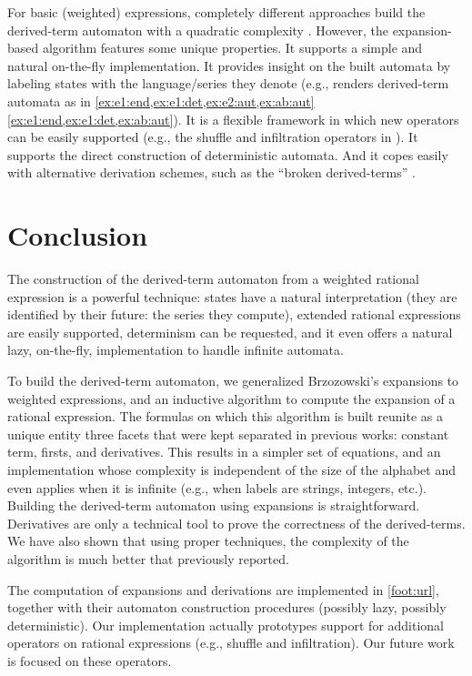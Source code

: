 \documentclass[a4paper,USenglish]{lipics}
\begin{document}
For basic (weighted) expressions, completely different approaches build the
derived-term automaton with a quadratic complexity
\citep{allauzen.2006.mfcs.2, champarnaud.2007.dlt.2}.  However, the
expansion-based algorithm features some unique properties.  It supports a
simple and natural on-the-fly implementation.  It provides insight on the
built automata by labeling states with the language/series they denote
(e.g., \vcsn renders derived-term automata as in 
{\cref{ex:e1:end,ex:e1:det,ex:e2:aut,ex:ab:aut}}
{\cref{ex:e1:end,ex:e1:det,ex:ab:aut}}).  It is a flexible framework in
which new operators can be easily supported (e.g., the shuffle and
infiltration operators in \vcsn).  It supports the direct construction of
deterministic automata.  And it copes easily with alternative derivation
schemes, such as the ``broken derived-terms'' \citep{lombardy.04.latin,
  lombardy.2005.tcs, lombardy.2010.rairo, angrand.2010.jalc}.

\section{Conclusion}
\label{sec:conc}
The construction of the derived-term automaton from a weighted rational
expression is a powerful technique: states have a natural interpretation
(they are identified by their future: the series they compute), extended
rational expressions are easily supported, determinism can be requested, and
it even offers a natural lazy, on-the-fly, implementation to handle infinite
automata.

To build the derived-term automaton, we generalized Brzozowski's expansions
to weighted expressions, and an inductive algorithm to compute the expansion
of a rational expression.  The formulas on which this algorithm is built
reunite as a unique entity three facets that were kept separated in previous
works: constant term, firsts, and derivatives.  This results in a simpler
set of equations, and an implementation whose complexity is independent of
the size of the alphabet and even applies when it is infinite (e.g., when
labels are strings, integers, etc.).  Building the derived-term automaton
using expansions is straightforward.  Derivatives are only a technical tool
to prove the correctness of the derived-terms.  We have also shown that
using proper techniques, the complexity of the algorithm is much better that
previously reported.

The computation of expansions and derivations are implemented in
\vcsn{}\cref{foot:url}, together with their automaton construction
procedures (possibly lazy, possibly deterministic).  Our implementation
actually prototypes support for additional operators on rational expressions
(e.g., shuffle and infiltration).  Our future work is focused on these
operators.
\end{document}
